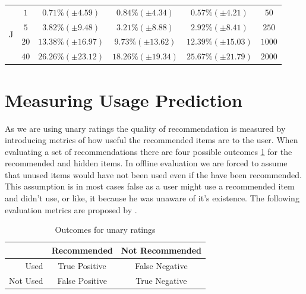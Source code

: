\documentclass[cic,tc,english]{iiufrgs}
\begin{document}
\begin{table}
{\begin{tabular}{| l || c | c | c | c | c |}
\hline \hline \multirow{4}{*}{J} & $1$ &$ 0.71\% (\pm 4.59) $&$ 0.84\% (\pm 4.34) $&$ 0.57\% (\pm 4.21) $&$50$ \\ \cline{2-6} 
& $5$ & $3.82\% (\pm 9.48) $&$ 3.21\% (\pm 8.88) $&$ 2.92\% (\pm 8.41) $&$ 250 $ \\ \cline{2-6} 
& $20$ & $13.38\% (\pm 16.97) $&$ 9.73\% (\pm 13.62) $&$ 12.39\% (\pm 15.03) $&$ 1000 $ \\ \cline{2-6} 
& $40$ & $26.26\% (\pm 23.12) $&$ 18.26\% (\pm 19.34) $&$ 25.67\% (\pm 21.79) $&$ 2000 $ \\ \cline{2-6}
\end{tabular}	}

\end{table}

\section{Measuring Usage Prediction}

As we are using unary ratings the quality of recommendation is measured by introducing metrics of how useful the recommended items are to the user. When evaluating a set of recommendations there are four possible outcomes \ref{tab:outcomes} for the recommended and hidden items.
In offline evaluation we are forced to assume that unused items would have not been used even if the have been recommended. This assumption is in most cases false as a user might use a recommended item and didn't use, or like, it because he was unaware of it's existence. The following evaluation metrics are proposed by \cite{shani2011evaluating}.

\begin{table}
\center
\caption{Outcomes for unary ratings}
\begin{tabular}{ r | c | c |   }

& Recommended & Not Recommended \\ \hline
Used & True Positive & False Negative   \\ \hline
Not Used & False Positive & True Negative  \\ 

\end{tabular}
\label{tab:outcomes}
\end{table}
\end{document}
